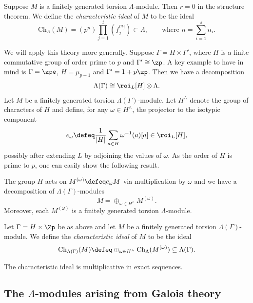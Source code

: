 \documentclass[a4paper,10pt, english, reqno]{smfart}
\newcommand{\GG}{\Gamma}
\numberwithin{equation}{section}
\begin{document}
\begin{definition}
	Suppose $M$ is a finitely generated torsion $\Lambda$-module. Then $r =0$ in the structure theorem. We define the \emph{characteristic ideal} of $M$ to be the ideal
	\[ 
	\mathrm{Ch}_{\Lambda}(M) = \left(p^{n}\right)\prod_{j=1}^t \left(f_j^{m_j}\right) \subset \Lambda, \qquad \text{where } n = \sum_{i = 1}^s n_i.
	\]
\end{definition}

We will apply this theory more generally. Suppose $\GG = H \times \Gamma'$, where $H$ is a finite commutative group of order prime to $p$ and $\Gamma' \cong \zp$.  A key example to have in mind is $\GG = \zpe$, $H = \mu_{p-1}$ and $\Gamma' = 1 + p \zp$. Then we have a decomposition
\[ 
\Lambda(\GG) \cong \roi_L[H] \otimes \Lambda. 
\] 
Let $M$ be a finitely generated torsion $\Lambda(\GG)$-module. Let $H^\wedge$ denote the group of characters of $H$ and define, for any $\omega \in H^\wedge$, the projector to the isotypic component
\[ e_\omega \defeq \frac{1}{|H|} \sum_{a \in H} \omega^{-1}(a) [a] \in \roi_L[H], \]
possibly after extending $L$ by adjoining the values of $\omega$. As the order of $H$ is prime to $p$, one can easily show the following result.

\begin{lemma}[{\cite[A.1]{CS06}}]
	The group $H$ acts on $M^{(\omega)} \defeq e_\omega M$ via multiplication by $\omega$ and we have a decomposition of $\Lambda(\GG)$-modules
	\[ M = \oplus_{\omega \in H^\wedge} M^{(\omega)}. \] Moreover, each $M^{(\omega)}$ is a finitely generated torsion $\Lambda$-module.
\end{lemma}


\begin{definition}
	Let $\GG = H \times \Zp$ be as above and let $M$ be a finitely generated torsion $\Lambda(\GG)$-module. We define the \emph{characteristic ideal} of $M$ to be the ideal
	\[ \mathrm{Ch}_{\Lambda(\GG)}(M) \defeq \oplus_{\omega \in H^\wedge} \mathrm{Ch}_\Lambda(M^{(\omega)}) \subseteq \Lambda(\GG). \] 
\end{definition}


\begin{lemma}[{\cite[A.1 Prop.\ 1]{CS06}}]
	The characteristic ideal is multiplicative in exact sequences.
\end{lemma}



\subsection{The $\Lambda$-modules arising from Galois theory} \label{SecLambdamods}
\end{document}
